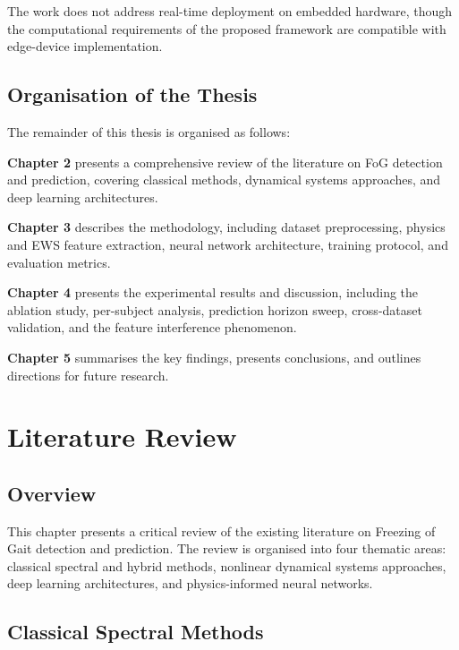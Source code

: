 \documentclass[12pt,a4paper,oneside]{report}
\numberwithin{equation}{chapter}
\numberwithin{figure}{chapter}
\numberwithin{table}{chapter}
\begin{document}
The work does not address real-time deployment on embedded hardware, though the computational requirements of the proposed framework are compatible with edge-device implementation.

\section{Organisation of the Thesis}

The remainder of this thesis is organised as follows:

\textbf{Chapter 2} presents a comprehensive review of the literature on FoG detection and prediction, covering classical methods, dynamical systems approaches, and deep learning architectures.

\textbf{Chapter 3} describes the methodology, including dataset preprocessing, physics and EWS feature extraction, neural network architecture, training protocol, and evaluation metrics.

\textbf{Chapter 4} presents the experimental results and discussion, including the ablation study, per-subject analysis, prediction horizon sweep, cross-dataset validation, and the feature interference phenomenon.

\textbf{Chapter 5} summarises the key findings, presents conclusions, and outlines directions for future research.


\chapter{Literature Review}

\section{Overview}

This chapter presents a critical review of the existing literature on Freezing of Gait detection and prediction. The review is organised into four thematic areas: classical spectral and hybrid methods, nonlinear dynamical systems approaches, deep learning architectures, and physics-informed neural networks.

\section{Classical Spectral Methods}
\end{document}
